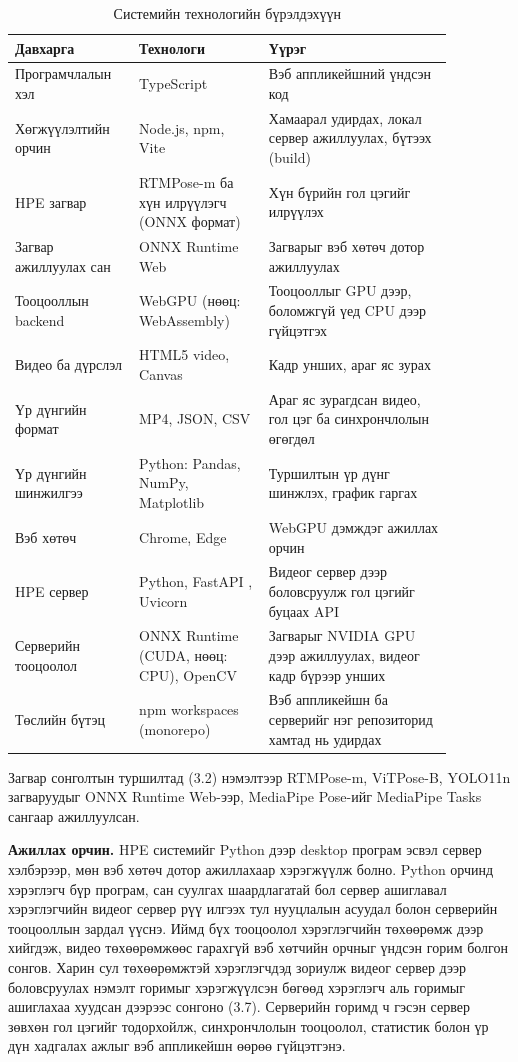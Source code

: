 \begin{table}[H]
\centering
\caption{Системийн технологийн бүрэлдэхүүн}
\label{tab:stack}
\small
\begin{tabular}{|>{\raggedright\arraybackslash}p{0.234\linewidth}|>{\raggedright\arraybackslash}p{0.260\linewidth}|>{\raggedright\arraybackslash}p{0.372\linewidth}|}
\hline
\textbf{Давхарга} & \textbf{Технологи} & \textbf{Үүрэг} \\ \hline
Програмчлалын хэл & TypeScript & Вэб аппликейшний үндсэн код \\ \hline
Хөгжүүлэлтийн орчин & Node.js, npm, Vite & Хамаарал удирдах, локал сервер ажиллуулах, бүтээх (build) \\ \hline
HPE загвар & RTMPose-m ба хүн илрүүлэгч (ONNX формат) & Хүн бүрийн гол цэгийг илрүүлэх \\ \hline
Загвар ажиллуулах сан & ONNX Runtime Web & Загварыг вэб хөтөч дотор ажиллуулах \\ \hline
Тооцооллын backend & WebGPU (нөөц: WebAssembly) & Тооцооллыг GPU дээр, боломжгүй үед CPU дээр гүйцэтгэх \\ \hline
Видео ба дүрслэл & HTML5 video, Canvas & Кадр унших, араг яс зурах \\ \hline
Үр дүнгийн формат & MP4, JSON, CSV & Араг яс зурагдсан видео, гол цэг ба синхрончлолын өгөгдөл \\ \hline
Үр дүнгийн шинжилгээ & Python: Pandas, NumPy, Matplotlib & Туршилтын үр дүнг шинжлэх, график гаргах \\ \hline
Вэб хөтөч & Chrome, Edge & WebGPU дэмждэг ажиллах орчин \\ \hline
HPE сервер & Python, FastAPI \cite{fastapi}, Uvicorn & Видеог сервер дээр боловсруулж гол цэгийг буцаах API \\ \hline
Серверийн тооцоолол & ONNX Runtime (CUDA, нөөц: CPU), OpenCV \cite{opencv} & Загварыг NVIDIA GPU дээр ажиллуулах, видеог кадр бүрээр унших \\ \hline
Төслийн бүтэц & npm workspaces (monorepo) & Вэб аппликейшн ба серверийг нэг репозиторид хамтад нь удирдах \\ \hline
\end{tabular}
\end{table}

Загвар сонголтын туршилтад (3.2) нэмэлтээр RTMPose-m, ViTPose-B, YOLO11n загваруудыг ONNX Runtime Web-ээр, MediaPipe Pose-ийг MediaPipe Tasks сангаар ажиллуулсан.

\textbf{Ажиллах орчин.} HPE системийг Python дээр desktop програм эсвэл сервер хэлбэрээр, мөн вэб хөтөч дотор ажиллахаар хэрэгжүүлж болно. Python орчинд хэрэглэгч бүр програм, сан суулгах шаардлагатай бол сервер ашиглавал хэрэглэгчийн видеог сервер рүү илгээх тул нууцлалын асуудал болон серверийн тооцооллын зардал үүснэ. Иймд бүх тооцоолол хэрэглэгчийн төхөөрөмж дээр хийгдэж, видео төхөөрөмжөөс гарахгүй вэб хөтчийн орчныг үндсэн горим болгон сонгов. Харин сул төхөөрөмжтэй хэрэглэгчдэд зориулж видеог сервер дээр боловсруулах нэмэлт горимыг хэрэгжүүлсэн бөгөөд хэрэглэгч аль горимыг ашиглахаа хуудсан дээрээс сонгоно (3.7). Серверийн горимд ч гэсэн сервер зөвхөн гол цэгийг тодорхойлж, синхрончлолын тооцоолол, статистик болон үр дүн хадгалах ажлыг вэб аппликейшн өөрөө гүйцэтгэнэ.

